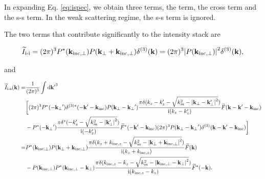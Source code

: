 \documentclass{mynotes}
\begin{document}
In expanding Eq. \ref{eq:ispec}, we obtain three terms, the  term, the cross  term and the s-s term. In the weak scattering regime, the s-s term is
ignored.

The two terms that contribute significantly to the intensity stack are

\begin{equation}
	\widetilde{I}_{\text{i-i}}
	=(2 \pi)^3 P^*(\mathbf{k_{\text{inc}, \perp}})P(\mathbf{k}_{\perp}+\mathbf{k}_{\text{inc}, \perp})\delta^{(3)}(\mathbf{k})
	=(2 \pi)^3 \abs{P(\mathbf{k_{\text{inc}, \perp}})}^2\delta^{(3)}(\mathbf{k}),
\end{equation}

and

\begin{equation}\label{eq:cross}
	\begin{aligned}
		\widetilde{I}_{\text{i-s}}(\mathbf{k})
		= & \frac{1}{(2 \pi)^3}\int\dd \mathbf{k'}^{3}\,                                             \\
		  & \bigg[(2 \pi)^3 P^*(-\mathbf{k_{\perp}}')
			\delta^{(3)*}(-\mathbf{k}'-\mathbf{k}_{\text{inc}})
			P(\mathbf{k_{\perp}}-\mathbf{k_{\perp}}')
			\frac{\pi \delta(k_z - k_z' - \sqrt{k_m^2 - \abs{\mathbf{k}_{\perp}-\mathbf{k}_{\perp}'}^2})}
		{\mathrm{i} (k_z-k_z')} \widetilde{F}(\mathbf{k}-\mathbf{k}'-\mathbf{k}_{\text{inc}})               \\
		  & -P^*(-\mathbf{k_{\perp}}')
			\frac{\pi \delta^{*}(-k_z' - \sqrt{k_m^2 - \abs{\mathbf{k}_{\perp}'}^2})}
			{\mathrm{i} (-k_z')} \widetilde{F}^*(-\mathbf{k}'-\mathbf{k}_{\text{inc}})
			(2 \pi)^3 P(\mathbf{k_{\perp}}-\mathbf{k_{\perp}}')
		\delta^{(3)}(\mathbf{k}-\mathbf{k}'-\mathbf{k}_{\text{inc}})\bigg]                           \\
		= & P^*(\mathbf{k_{\text{inc}, \perp}})P(\mathbf{k}_{\perp}+\mathbf{k}_{\text{inc}, \perp})
		\frac{\pi \delta(k_z + k_{\text{inc}, z} - \sqrt{k_m^2 - \abs{\mathbf{k}_{\perp}+\mathbf{k}_{\text{inc}, \perp}}^2})}
		{\mathrm{i} (k_z+k_{\text{inc},z})} \widetilde{F}(\mathbf{k})                                       \\
		  & -P(\mathbf{k_{\text{inc}, \perp}})P^*(\mathbf{k_{\text{inc}, \perp}}-\mathbf{k_{\perp}})
		\frac{\pi \delta(k_{\text{inc}, z} - k_z - \sqrt{k_m^2 - \abs{\mathbf{k}_{\text{inc}, \perp}-\mathbf{k}_{\perp}}^2})}
		{\mathrm{i} (k_{\text{inc}, z} - k_z)} \widetilde{F}^*(-\mathbf{k}).                                \\
	\end{aligned}
\end{equation}
\end{document}
